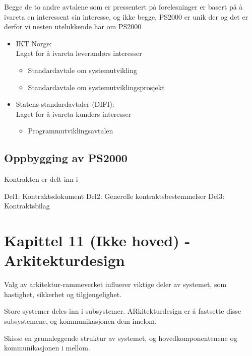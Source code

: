 \documentclass[11pt]{article}
\begin{document}
    
    Begge de to andre avtalene som er pressentert på forelesninger er basert
    på å ivareta en interessent sin interesse, og ikke begge, PS2000 er unik der
    og det er derfor vi nesten utelukkende har om PS2000
\begin{itemize}

\item IKT Norge:\\
\label{sec-11.3.1.1}%
Laget for å ivareta leverandørs interesser
\begin{itemize}

\item Standardavtale om systemutvikling\\
\label{sec-11.3.1.1.1}%
\item Standardavtale om systemutviklingsprosjekt\\
\label{sec-11.3.1.1.2}%
\end{itemize} %

\item Statens standardavtaler (DIFI):\\
\label{sec-11.3.1.2}%
Laget for å ivareta kunders interesser
\begin{itemize}

\item Programmutviklingsavtalen\\
\label{sec-11.3.1.2.1}%
\end{itemize} %
\end{itemize} %
\subsection{Oppbygging av PS2000}
\label{sec-11.4}

   Kontrakten er delt inn i

   Del1: Kontraktsdokument 
   Del2: Generelle kontraktsbestemmelser 
   Del3: Kontraktsbilag
\section{Kapittel 11 (Ikke hoved) - Arkitekturdesign}
\label{sec-12}

  Valg av arkitektur-rammeverket influerer viktige deler av systemet, som hastighet, sikkerhet og tilgjengelighet. 

  Store systemer deles inn i subsystemer. ARkitekturdesign er å fastsette disse subsystemene, og kommunikasjonen dem imelom.
  
  Skisse en grunnleggende struktur av systemet, og hovedkomponentenene og kommunikasjonen i mellom.
\end{document}
